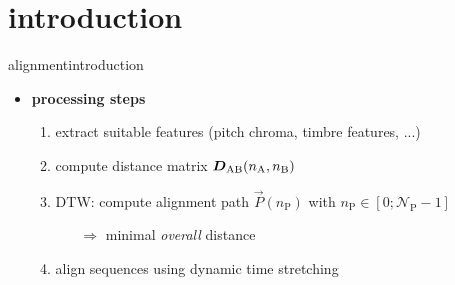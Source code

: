     \section[intro]{introduction}
        \begin{frame}{alignment}{introduction}
            \begin{itemize}
            \item<2->   \textbf{processing steps}
                \begin{enumerate}
                    \item   extract suitable features (pitch chroma, timbre features, ...)
                    \item<3->	compute distance matrix $\mat{D}_{\mathrm{AB}}(n_\mathrm{A},n_\mathrm{B})$
                    \item<4->	DTW: compute alignment path $\vec{P}(n_\mathrm{P})$ with $n_\mathrm{P} \in
                [0;\mathcal{N}_{\mathrm{P}}-1]$
                        \begin{itemize}
                            \item[$\Rightarrow$]	minimal \textit{overall} distance
                        \end{itemize}
                    \item<5->   align sequences using dynamic time stretching
                \end{enumerate}
            \end{itemize}
        \end{frame}
